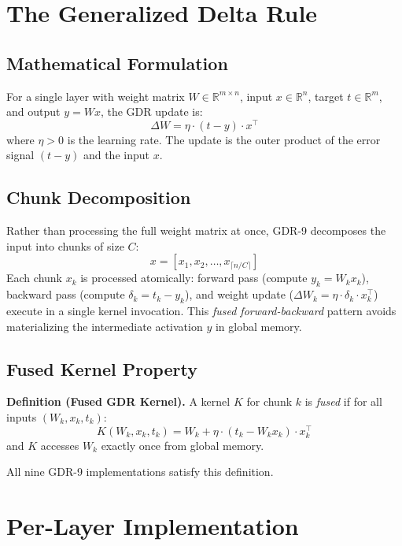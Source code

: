 \documentclass[10pt,conference]{IEEEtran}
\begin{document}
\section{The Generalized Delta Rule}
\label{sec:gdr}

\subsection{Mathematical Formulation}

For a single layer with weight matrix $W \in \mathbb{R}^{m \times n}$,
input $x \in \mathbb{R}^n$, target $t \in \mathbb{R}^m$, and
output $y = Wx$, the GDR update is:
\[
  \Delta W = \eta \cdot (t - y) \cdot x^\top
\]
where $\eta > 0$ is the learning rate. The update is the outer product of
the error signal $(t - y)$ and the input $x$.

\subsection{Chunk Decomposition}

Rather than processing the full weight matrix at once, GDR-9 decomposes the
input into chunks of size $C$:
\[
  x = [x_1, x_2, \ldots, x_{\lceil n/C \rceil}]
\]
Each chunk $x_k$ is processed atomically: forward pass (compute $y_k = W_k x_k$),
backward pass (compute $\delta_k = t_k - y_k$), and weight update
($\Delta W_k = \eta \cdot \delta_k \cdot x_k^\top$) execute in a single kernel
invocation. This \emph{fused forward-backward} pattern avoids materializing the
intermediate activation $y$ in global memory.

\subsection{Fused Kernel Property}

\textbf{Definition (Fused GDR Kernel).} A kernel $K$ for chunk $k$ is
\emph{fused} if for all inputs $(W_k, x_k, t_k)$:
\[
  K(W_k, x_k, t_k) = W_k + \eta \cdot (t_k - W_k x_k) \cdot x_k^\top
\]
and $K$ accesses $W_k$ exactly once from global memory.

All nine GDR-9 implementations satisfy this definition.


\section{Per-Layer Implementation}
\label{sec:impl}
\end{document}
